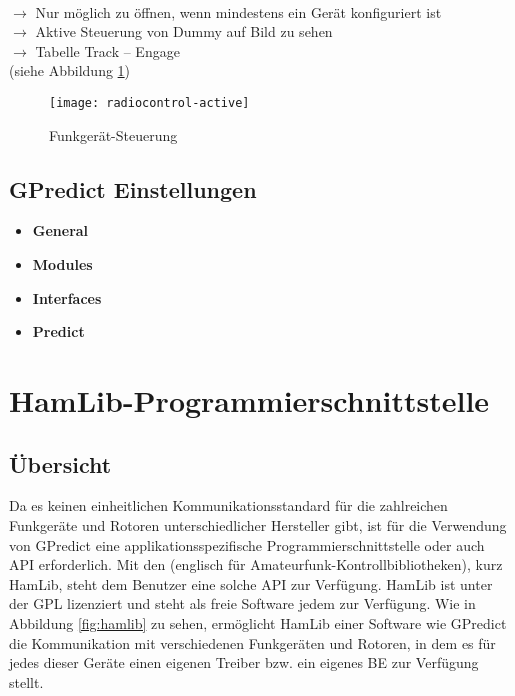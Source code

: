 \\
$\rightarrow$ Nur möglich zu öffnen, wenn mindestens ein Gerät konfiguriert ist\\
$\rightarrow$ Aktive Steuerung von Dummy auf Bild zu sehen\\
$\rightarrow$ Tabelle Track -- Engage\\
(siehe Abbildung \ref{fig:radiocontrol})

\begin{figure}[h]
	\centering
	\texttt{[image: radiocontrol-active]}
	\caption{Funkgerät-Steuerung}
	\label{fig:radiocontrol} 
\end{figure}

\clearpage

\subsection{GPredict Einstellungen}

\begin{itemize}
	\parskip0pt
	\item \textbf{General}
	\item \textbf{Modules}
	\item \textbf{Interfaces}
	\item \textbf{Predict}
\end{itemize}

\clearpage

\section{HamLib-Programmierschnittstelle}

\subsection{Übersicht}

Da es keinen einheitlichen Kommunikationsstandard für die zahlreichen Funkgeräte und Rotoren unterschiedlicher Hersteller gibt, ist für die Verwendung von GPredict eine applikationsspezifische Programmierschnittstelle oder auch \ac{API} erforderlich. Mit den  (englisch für Amateurfunk-Kontrollbibliotheken), kurz HamLib, steht dem Benutzer eine solche \ac{API} zur Verfügung. HamLib ist unter der \ac{GPL} lizenziert und steht als freie Software jedem zur Verfügung. Wie in Abbildung \ref{fig:hamlib} zu sehen, ermöglicht HamLib einer Software wie GPredict die Kommunikation mit verschiedenen Funkgeräten und Rotoren, in dem es für jedes dieser Geräte einen eigenen Treiber bzw. ein eigenes \ac{BE} zur Verfügung stellt.

